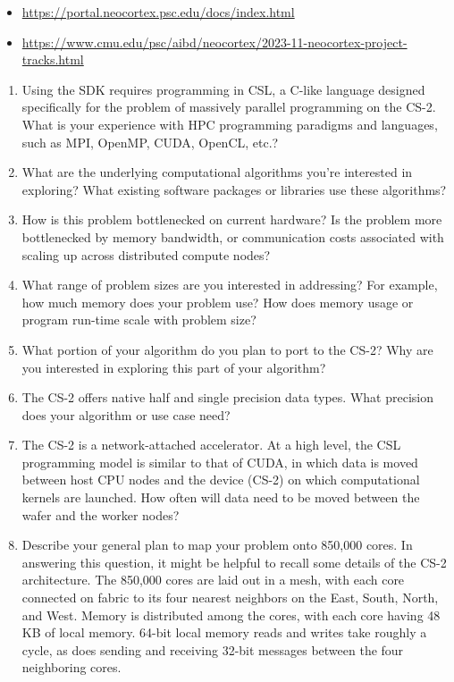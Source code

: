 \begin{displayquote} \itshape
    \begin{itemize}
    \item \url{https://portal.neocortex.psc.edu/docs/index.html}
    \item \url{https://www.cmu.edu/psc/aibd/neocortex/2023-11-neocortex-project-tracks.html}
    \end{itemize}
\end{displayquote}

\begin{displayquote} \itshape
    \begin{enumerate}
    \item Using the SDK requires programming in CSL, a C-like language designed specifically for the problem of massively parallel programming on the CS-2.
    What is your experience with HPC programming paradigms and languages, such as MPI, OpenMP, CUDA, OpenCL, etc.?
    \item What are the underlying computational algorithms you're interested in exploring?
    What existing software packages or libraries use these algorithms?
    \item How is this problem bottlenecked on current hardware?
    Is the problem more bottlenecked by memory bandwidth, or communication costs associated with scaling up across distributed compute nodes?
    \item What range of problem sizes are you interested in addressing?
    For example, how much memory does your problem use?
    How does memory usage or program run-time scale with problem size?
    \item What portion of your algorithm do you plan to port to the CS-2?
    Why are you interested in exploring this part of your algorithm?
    \item The CS-2 offers native half and single precision data types.
    What precision does your algorithm or use case need?
    \item The CS-2 is a network-attached accelerator. At a high level, the CSL programming model is similar to that of CUDA, in which data is moved between host CPU nodes and the device (CS-2) on which computational kernels are launched.
    How often will data need to be moved between the wafer and the worker nodes?
    \item Describe your general plan to map your problem onto 850,000 cores. In answering this question, it might be helpful to recall some details of the CS-2 architecture.
    The 850,000 cores are laid out in a mesh, with each core connected on fabric to its four nearest neighbors on the East, South, North, and West.
    Memory is distributed among the cores, with each core having 48 KB of local memory.
    64-bit local memory reads and writes take roughly a cycle, as does sending and receiving 32-bit messages between the four neighboring cores.
    \end{enumerate}
\end{displayquote}
